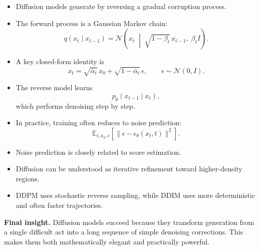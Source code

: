 \begin{itemize}
    \item Diffusion models generate by reversing a gradual corruption process.
    \item The forward process is a Gaussian Markov chain:
    \[
    q(x_t \mid x_{t-1})
    =
    \mathcal{N}\!\left(
    x_t \;\middle|\; \sqrt{1-\beta_t}\,x_{t-1},\; \beta_t I
    \right).
    \]
    \item A key closed-form identity is
    \[
    x_t
    =
    \sqrt{\bar{\alpha}_t}\,x_0
    +
    \sqrt{1-\bar{\alpha}_t}\,\epsilon,
    \qquad
    \epsilon \sim \mathcal{N}(0,I).
    \]
    \item The reverse model learns
    \[
    p_\theta(x_{t-1}\mid x_t),
    \]
    which performs denoising step by step.
    \item In practice, training often reduces to noise prediction:
    \[
    \mathbb{E}_{t,x_0,\epsilon}
    \left[
    \|\epsilon-\epsilon_\theta(x_t,t)\|^2
    \right].
    \]
    \item Noise prediction is closely related to score estimation.
    \item Diffusion can be understood as iterative refinement toward higher-density regions.
    \item DDPM uses stochastic reverse sampling, while DDIM uses more deterministic and often faster trajectories.
\end{itemize}

\medskip

\noindent
\textbf{Final insight.}  
Diffusion models succeed because they transform generation from a single difficult act into a long sequence of simple denoising corrections. This makes them both mathematically elegant and practically powerful.